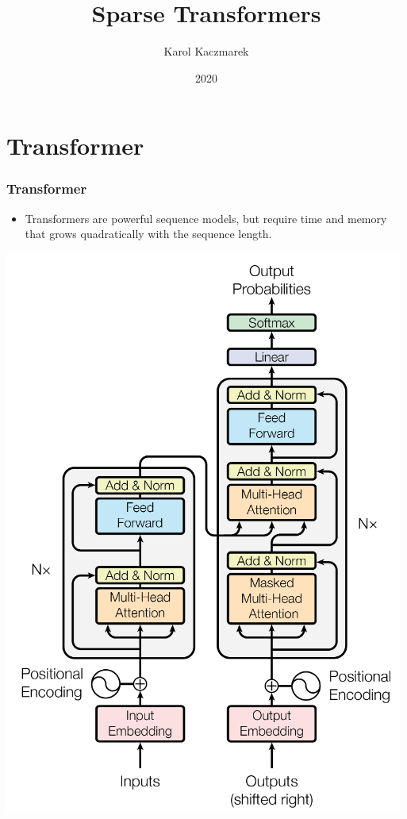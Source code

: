\documentclass{beamer}
\title{Sparse Transformers}
\date{2020}
\author{Karol Kaczmarek}
\begin{document}
\begin{frame}
    \titlepage
\end{frame}

\section{Transformer}
\begin{frame}
    \frametitle{Transformer \cite{transformer}}
    \begin{itemize}
        \item Transformers are powerful sequence models, but require time and memory that grows quadratically with the sequence length.
    \end{itemize}
    \begin{center}
        \includegraphics[scale=0.75]{img/transformer.png}

\end{center}
\end{frame}
\end{document}
